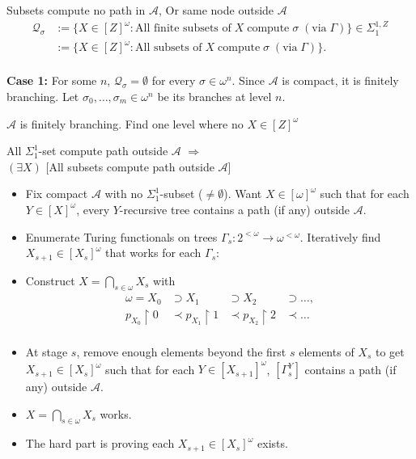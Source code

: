\begin{frame}{Subsets compute no path in $\mathcal{A}$, Or same node
outside $\mathcal{A}$}
  \begin{align*}
    \mathcal{Q}_{\sigma} &:=\{X\in[Z]^\omega: \text{All finite subsets
      of}\; X\; \text{compute}\; \sigma\; (\text{via}\; \Gamma)\}
      \in\Sigma_1^{1,Z}\\
    &:=\{X\in[Z]^\omega: \text{All subsets of}\; X\; \text{compute}\;
      \sigma\; (\text{via}\; \Gamma)\}.\\
  \end{align*}

  \textbf{Case 1:} For some $n$, $\mathcal{Q}_\sigma=\emptyset$ for every
  $\sigma\in\omega^n$. Since $\mathcal{A}$ is compact, it is finitely
  branching. Let $\sigma_0,\ldots,\sigma_m\in\omega^n$ be its branches at
  level $n$.

  $\mathcal{A}$ is finitely branching. Find one level where no
  $X\in[Z]^\omega$
\end{frame}

\begin{frame}{All $\Sigma_1^1$-set compute path outside $\mathcal{A}$
$\Rightarrow$\\ $(\exists X)$ {[All subsets compute path outside
$\mathcal{A}$]}}
  \begin{itemize}
    \item Fix compact $\mathcal{A}$ with no $\Sigma_1^1$-subset
      ($\neq\emptyset$). Want $X\in[\omega]^\omega$ such that for each
      $Y\in[X]^\omega$, every $Y$-recursive tree contains a path (if any)
      outside $\mathcal{A}$.
    \item Enumerate Turing functionals on trees
      $\Gamma_s:2^{<\omega} \rightarrow \omega^{<\omega}$. Iteratively
      find $X_{s+1}\in[X_s]^\omega$ that works for each $\Gamma_s$:
    \item Construct $X=\bigcap_{s\in\omega}X_s$ with
      \[\begin{array}{rlll}
        \omega=X_0 &\supset X_1 &\supset X_2 &\supset\ldots,\\
        p_{X_0}\restriction0 &\prec p_{X_1}\restriction1 &\prec
          p_{X_2}\restriction2 &\prec\ldots\\
      \end{array}\]
    \item At stage $s$, remove enough elements beyond the first $s$
      elements of $X_s$ to get $X_{s+1}\in[X_s]^\omega$ such that for each
      $Y\in[X_{s+1}]^\omega$, $[\Gamma_s^Y]$
      contains a path (if any) outside $\mathcal{A}$.
    \item $X=\bigcap_{s\in\omega}X_s$ works.
    \item The hard part is proving each $X_{s+1}\in[X_s]^\omega$ exists.
  \end{itemize}
\end{frame}


